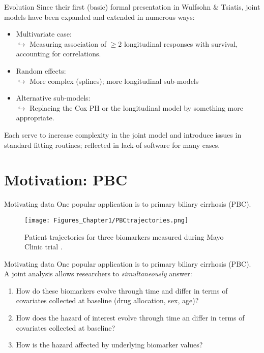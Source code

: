 \documentclass[10pt]{beamer}
\begin{document}
\begin{frame}{Evolution}
    Since their first (basic) formal presentation in Wulfsohn \& Tsiatis, joint models have been expanded and extended in numerous ways:
    \begin{itemize}
        \item Multivariate case:\\
        $\hookrightarrow$ Measuring association of $\ge2$ longitudinal responses with survival, accounting for correlations.
        \item Random effects:\\
        $\hookrightarrow$ More complex (\eg splines); more longitudinal sub-models
        \item Alternative sub-models:\\
        $\hookrightarrow$ Replacing the Cox PH or the longitudinal model by something more appropriate.
    \end{itemize}
    \vspace*{5mm}
    Each serve to increase complexity in the joint model and introduce issues in standard fitting routines; reflected in lack-of software for many cases.
\end{frame}

\section{Motivation: PBC}
\begin{frame}{Motivating data}
One popular application is to primary biliary cirrhosis (PBC).
\vspace*{5mm}
\begin{figure}
    \centering
    \texttt{[image: Figures\_Chapter1/PBCtrajectories.png]}
    \caption{Patient trajectories for three biomarkers measured during Mayo Clinic trial \cite{PBCarticle}.}
    \label{fig:pbc-trajectories}
\end{figure}
    
\end{frame}

\begin{frame}{Motivating data}
One popular application is to primary biliary cirrhosis (PBC).\\
\vspace*{5mm}
A joint analysis allows researchers to \textit{simultaneously} answer:

\begin{enumerate}
    \item How do these biomarkers evolve through time and differ in terms of covariates collected at baseline (\eg drug allocation, sex, age)?
    \item How does the hazard of interest evolve through time an differ in terms of covariates collected at baseline?
    \item How is the hazard affected by underlying biomarker values?
\end{enumerate}
    
\end{frame}
\end{document}
